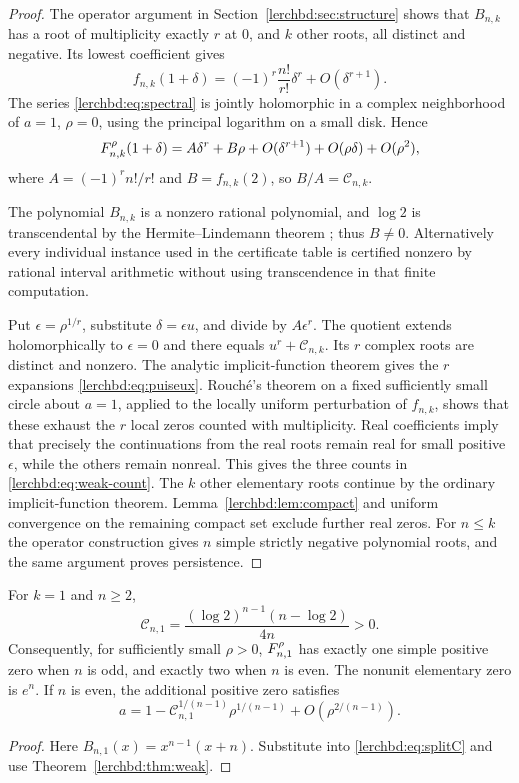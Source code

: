 \begin{proof}
The operator argument in Section~\ref{lerchbd:sec:structure} shows that $B_{n,k}$ has a root of multiplicity exactly $r$ at $0$, and $k$ other roots, all distinct and negative. Its lowest coefficient gives
\begin{equation}\label{lerchbd:eq:localA}
 f_{n,k}(1+\delta)=(-1)^r\frac{n!}{r!}\delta^r+O(\delta^{r+1}).
\end{equation}
The series \eqref{lerchbd:eq:spectral} is jointly holomorphic in a complex neighborhood of $a=1$, $\rho=0$, using the principal logarithm on a small disk. Hence
\[
 F_{n,k}^{\rho}(1+\delta)
 =A\delta^r+B\rho+O(\delta^{r+1})+O(\rho\delta)+O(\rho^2),
\]
where $A=(-1)^rn!/r!$ and $B=f_{n,k}(2)$, so $B/A=\mathcal C_{n,k}$.

The polynomial $B_{n,k}$ is a nonzero rational polynomial, and $\log2$ is transcendental by the Hermite--Lindemann theorem \cite{lerchbd:lindemann}; thus $B\ne0$. Alternatively every individual instance used in the certificate table is certified nonzero by rational interval arithmetic without using transcendence in that finite computation.

Put $\epsilon=\rho^{1/r}$, substitute $\delta=\epsilon u$, and divide by $A\epsilon^r$. The quotient extends holomorphically to $\epsilon=0$ and there equals $u^r+\mathcal C_{n,k}$. Its $r$ complex roots are distinct and nonzero. The analytic implicit-function theorem gives the $r$ expansions \eqref{lerchbd:eq:puiseux}. Rouch\'e's theorem on a fixed sufficiently small circle about $a=1$, applied to the locally uniform perturbation of $f_{n,k}$, shows that these exhaust the $r$ local zeros counted with multiplicity. Real coefficients imply that precisely the continuations from the real roots remain real for small positive $\epsilon$, while the others remain nonreal. This gives the three counts in \eqref{lerchbd:eq:weak-count}. The $k$ other elementary roots continue by the ordinary implicit-function theorem. Lemma~\ref{lerchbd:lem:compact} and uniform convergence on the remaining compact set exclude further real zeros. For $n\le k$ the operator construction gives $n$ simple strictly negative polynomial roots, and the same argument proves persistence.
\end{proof}

\begin{corollary}\label{lerchbd:cor:k1collapse}
For $k=1$ and $n\ge2$,
\begin{equation}\label{lerchbd:eq:Ck1}
 \mathcal C_{n,1}=\frac{(\log2)^{n-1}(n-\log2)}{4n}>0.
\end{equation}
Consequently, for sufficiently small $\rho>0$, $F_{n,1}^{\rho}$ has exactly one simple positive zero when $n$ is odd, and exactly two when $n$ is even. The nonunit elementary zero is $e^n$. If $n$ is even, the additional positive zero satisfies
\[
 a=1-\mathcal C_{n,1}^{1/(n-1)}\rho^{1/(n-1)}
 +O(\rho^{2/(n-1)}).
\]
\end{corollary}
\begin{proof}
Here $B_{n,1}(x)=x^{n-1}(x+n)$. Substitute into \eqref{lerchbd:eq:splitC} and use Theorem~\ref{lerchbd:thm:weak}.
\end{proof}

